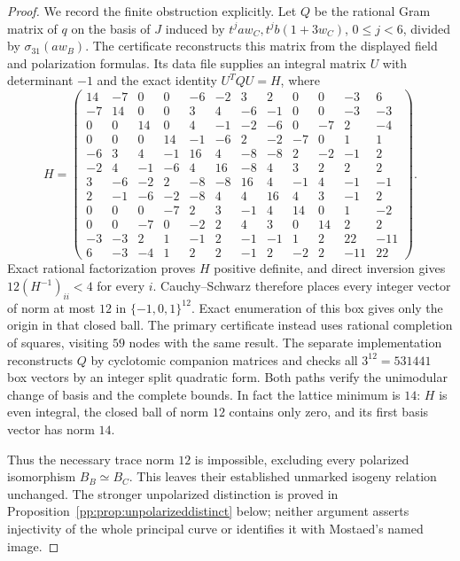 \begin{proof}
We record the finite obstruction explicitly. Let $Q$ be the rational
Gram matrix of $q$ on the basis of $J$ induced by
$t^ja w_C,t^jb(1+3w_C)$, $0\leq j<6$, divided by
$\sigma_{31}(aw_B)$. The certificate
 reconstructs this
matrix from the displayed field and polarization formulas. Its data
file  supplies an
integral matrix $U$ with determinant $-1$ and the exact identity
$U^TQU=H$, where
\begingroup
\setlength{\arraycolsep}{2.3pt}
\scriptsize
\[
H=\left(\begin{array}{*{12}{r}}
14&-7&0&0&-6&-2&3&2&0&0&-3&6\\
-7&14&0&0&3&4&-6&-1&0&0&-3&-3\\
0&0&14&0&4&-1&-2&-6&0&-7&2&-4\\
0&0&0&14&-1&-6&2&-2&-7&0&1&1\\
-6&3&4&-1&16&4&-8&-8&2&-2&-1&2\\
-2&4&-1&-6&4&16&-8&4&3&2&2&2\\
3&-6&-2&2&-8&-8&16&4&-1&4&-1&-1\\
2&-1&-6&-2&-8&4&4&16&4&3&-1&2\\
0&0&0&-7&2&3&-1&4&14&0&1&-2\\
0&0&-7&0&-2&2&4&3&0&14&2&2\\
-3&-3&2&1&-1&2&-1&-1&1&2&22&-11\\
6&-3&-4&1&2&2&-1&2&-2&2&-11&22
\end{array}\right).
\]
\endgroup
Exact rational factorization proves $H$ positive definite, and direct
inversion gives $12(H^{-1})_{ii}<4$ for every $i$. Cauchy--Schwarz
therefore places every integer vector of norm at most $12$ in
$\{-1,0,1\}^{12}$. Exact enumeration of this box gives only the
origin in that closed ball. The primary certificate instead uses
rational completion of squares, visiting $59$ nodes with the same
result. The separate implementation
 reconstructs $Q$
by cyclotomic companion matrices and checks all $3^{12}=531441$ box
vectors by an integer split quadratic form. Both paths verify the
unimodular change of basis and the complete bounds.
In fact the lattice minimum is $14$: $H$ is even integral, the
closed ball of norm $12$ contains only zero, and its first basis vector
has norm $14$.

Thus the necessary trace norm $12$ is impossible, excluding every
polarized isomorphism $B_B\simeq B_C$. This leaves their established
unmarked isogeny relation unchanged. The stronger unpolarized distinction
is proved in Proposition~\ref{pp:prop:unpolarizeddistinct} below; neither
argument asserts injectivity of the whole principal curve or identifies
it with Mostaed's named image.
\end{proof}


